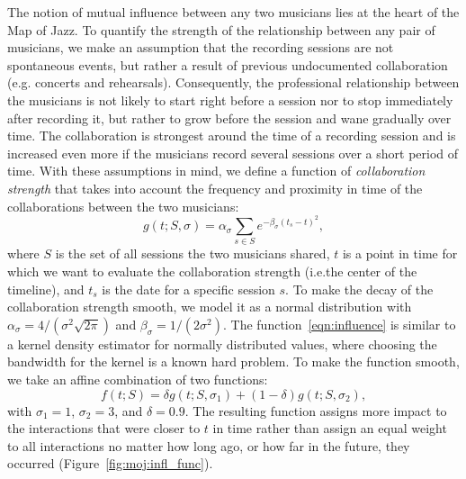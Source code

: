 \documentclass[12pt]{cmuthesis}
\begin{document}
  The notion of mutual influence between any two musicians lies at the heart of the Map of Jazz. To quantify the strength of the relationship between any pair of musicians, we make an assumption that the recording sessions are not spontaneous events, but rather a result of previous undocumented collaboration (e.g. concerts and rehearsals). Consequently, the professional relationship between the musicians is not likely to start right before a session nor to stop immediately after recording it, but rather to grow before the session and wane gradually over time. The collaboration is strongest around the time of a recording session and is increased even more if the musicians record several sessions over a short period of time. With these assumptions in mind, we define a function of \emph{collaboration strength} that takes into account the frequency and proximity in time of the collaborations between the two musicians:
  \begin{equation}\label{eqn:influence}
  g(t; S, \sigma) = \alpha_\sigma \sum_{s \in S} e^{-\beta_\sigma(t_s-t)^2 },
  \end{equation}
  where $S$ is the set of all sessions the two musicians shared, $t$ is a point in time for which we want to evaluate the collaboration strength (i.e.\@ the center of the timeline), and $t_s$ is the date for a specific session $s$. To make the decay of the collaboration strength smooth, we model it as a normal distribution with $\alpha_\sigma = 4/(\sigma^2\sqrt{2\pi})$ and $\beta_\sigma = 1/(2\sigma^2)$. %
  The function~\eqref{eqn:influence} is similar to a kernel density estimator for normally distributed values, where choosing the bandwidth for the kernel is a known hard problem. To make the function smooth, we take an affine combination of two functions:
  \begin{equation}\label{eqn:influence2}
  f(t; S) = \delta g(t; S, \sigma_1) + (1-\delta)g(t; S, \sigma_2),
  \end{equation}
  with $\sigma_1 = 1$, $\sigma_2 = 3$, and $\delta=0.9$. The resulting function assigns more impact to the interactions that were closer to $t$ in time rather than assign an equal weight to all interactions no matter how long ago, or how far in the future, they occurred (Figure~\ref{fig:moj:infl_func}).

\end{document}
